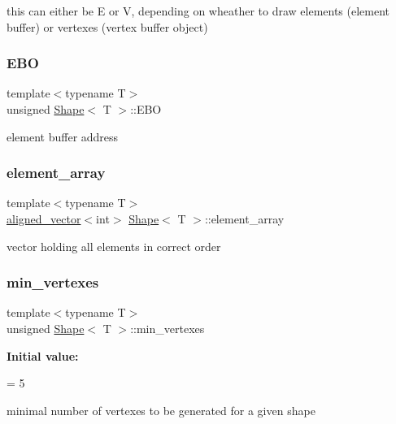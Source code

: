 this can either be \textquotesingle{}E\textquotesingle{} or \textquotesingle{}V\textquotesingle{}, depending on wheather to draw elements (element buffer) or vertexes (vertex buffer object) \mbox{\label{classShape_a95c775e548b129e23d2dd32e23fb0f3e}} 
\subsubsection{\texorpdfstring{E\+BO}{EBO}}
{\footnotesize\ttfamily template$<$typename T$>$ \\
unsigned \mbox{\hyperlink{classShape}{Shape}}$<$ T $>$\+::E\+BO\hspace{0.3cm}{\ttfamily [protected]}}

element buffer address \mbox{\label{classShape_accef3084e7e3897e01806b90da0a0ec8}} 
\subsubsection{\texorpdfstring{element\+\_\+array}{element\_array}}
{\footnotesize\ttfamily template$<$typename T$>$ \\
\mbox{\hyperlink{type__definitions_8hpp_a087efd587d66b881646ef378f1919c90}{aligned\+\_\+vector}}$<$int$>$ \mbox{\hyperlink{classShape}{Shape}}$<$ T $>$\+::element\+\_\+array\hspace{0.3cm}{\ttfamily [protected]}}

vector holding all elements in correct order \mbox{\label{classShape_acb30d3bdd3434dc2cb3074a4d61985ed}} 
\subsubsection{\texorpdfstring{min\+\_\+vertexes}{min\_vertexes}}
{\footnotesize\ttfamily template$<$typename T$>$ \\
unsigned \mbox{\hyperlink{classShape}{Shape}}$<$ T $>$\+::min\+\_\+vertexes\hspace{0.3cm}{\ttfamily [protected]}}

{\bfseries Initial value\+:}
\begin{DoxyCode}
=
        5
\end{DoxyCode}
minimal number of vertexes to be generated for a given shape \mbox{\label{classShape_a30771567edd66db5d14dc630f2d63f82}} 
